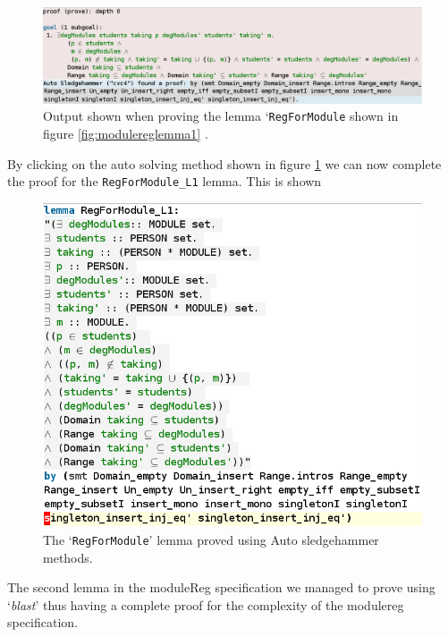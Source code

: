 \begin{figure}[H]
\centering
\includegraphics[scale=0.35]{Figures/Evaluation/moduleregproof.png}
\caption{Output shown when proving the lemma `\texttt{RegForModule} shown in figure \ref{fig:modulereglemma1} . \label{fig:autosolvermodulereg}}
\end{figure}

By clicking on the auto solving method shown in figure
\ref{fig:autosolvermodulereg} we can now complete the proof for the
\verb|RegForModule_L1| lemma. This is shown 

\begin{figure}[H]
\centering
\includegraphics[scale=0.5]{Figures/Evaluation/provenmodulelemma.png}
\caption{The `\texttt{RegForModule}' lemma proved using Auto sledgehammer methods. \label{fig:solvedmodulelemma}}
\end{figure}

The second lemma in the moduleReg specification we managed to prove using
`\emph{blast}' thus having a complete proof for the complexity of the modulereg
specification.

